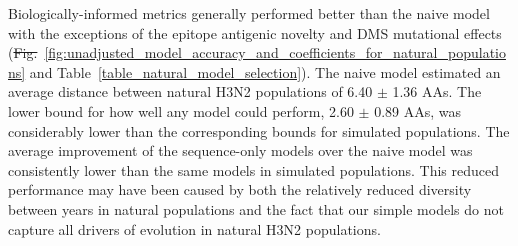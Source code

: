 \documentclass[9pt,lineno]{elife} %
\providecommand{\DIFadd}[1]{{\protect\color{blue}\uwave{#1}}} %
\providecommand{\DIFdel}[1]{{\protect\color{red}\sout{#1}}}                      %
\providecommand{\DIFaddbegin}{} %
\providecommand{\DIFaddend}{} %
\providecommand{\DIFdelbegin}{} %
\providecommand{\DIFdelend}{} %
\providecommand{\DIFaddendFL}{} %
\providecommand{\DIFaddtex}[1]{{\protect\color{blue}\uwave{#1}}} %
\providecommand{\DIFdeltex}[1]{{\protect\color{red}\sout{#1}}}                      %
\providecommand{\DIFaddbegin}{} %
\providecommand{\DIFaddend}{} %
\providecommand{\DIFdelbegin}{} %
\providecommand{\DIFdelend}{} %
\providecommand{\DIFaddendFL}{} %
\providecommand{\DIFadd}[1]{\texorpdfstring{\DIFaddtex{#1}}{#1}} %
\providecommand{\DIFdel}[1]{\texorpdfstring{\DIFdeltex{#1}}{}} %
\newcommand{\DIFscaledelfig}{0.5}
\newlength{\DIFdelgraphicswidth} %
\newlength{\DIFdelgraphicsheight} %
\newcommand{\DIFaddincludegraphics}[2][]{{\color{blue}\fbox{\DIFOincludegraphics[#1]{#2}}}} %
\newcommand{\DIFdelincludegraphics}[2][]{%
\sbox{\DIFdelgraphicsbox}{\DIFOincludegraphics[#1]{#2}}%
\settoboxwidth{\DIFdelgraphicswidth}{\DIFdelgraphicsbox} %
\settoboxtotalheight{\DIFdelgraphicsheight}{\DIFdelgraphicsbox} %
\scalebox{\DIFscaledelfig}{%
\parbox[b]{\DIFdelgraphicswidth}{\usebox{\DIFdelgraphicsbox}\\[-\baselineskip] \rule{\DIFdelgraphicswidth}{0em}}\llap{\resizebox{\DIFdelgraphicswidth}{\DIFdelgraphicsheight}{%
\setlength{\unitlength}{\DIFdelgraphicswidth}%
\begin{picture}(1,1)%
\thicklines\linethickness{2pt} %
{\color[rgb]{1,0,0}\put(0,0){\framebox(1,1){}}}%
{\color[rgb]{1,0,0}\put(0,0){\line( 1,1){1}}}%
{\color[rgb]{1,0,0}\put(0,1){\line(1,-1){1}}}%
\end{picture}%
}\hspace*{3pt}}} %
} %
\DeclareRobustCommand{\DIFaddbegin}{\DIFOaddbegin \let\includegraphics\DIFaddincludegraphics} %
\DeclareRobustCommand{\DIFaddend}{\DIFOaddend \let\includegraphics\DIFOincludegraphics} %
\DeclareRobustCommand{\DIFdelbegin}{\DIFOdelbegin \let\includegraphics\DIFdelincludegraphics} %
\DeclareRobustCommand{\DIFdelend}{\DIFOaddend \let\includegraphics\DIFOincludegraphics} %
\DeclareRobustCommand{\DIFaddendFL}{\DIFOaddendFL \let\includegraphics\DIFOincludegraphics} %
\begin{document}
\begin{figure}[htb]
  \label{figsupp:unadjusted_composite_model_accuracy_and_coefficients_for_natural_populations_epitope_vs_oracle}

\DIFaddendFL \end{figure}

Biologically-informed metrics generally performed better than the naive model with the exceptions of the epitope antigenic novelty and DMS mutational effects (\DIFdelbegin \DIFdel{Fig.}\DIFdelend \DIFaddbegin \DIFadd{Figure}\DIFaddend ~\ref{fig:unadjusted_model_accuracy_and_coefficients_for_natural_populations} and Table~\ref{table_natural_model_selection}).
The naive model estimated an average distance between natural H3N2 populations of 6.40 $\pm$ 1.36 AAs.
The lower bound for how well any model could perform, 2.60 $\pm$ 0.89 AAs, was considerably lower than the corresponding bounds for simulated populations.
The average improvement of the sequence-only models over the naive model was consistently lower than the same models in simulated populations.
This reduced performance may have been caused by both the relatively reduced diversity between years in natural populations and the fact that our simple models do not capture all drivers of evolution in natural H3N2 populations.
\end{document}

